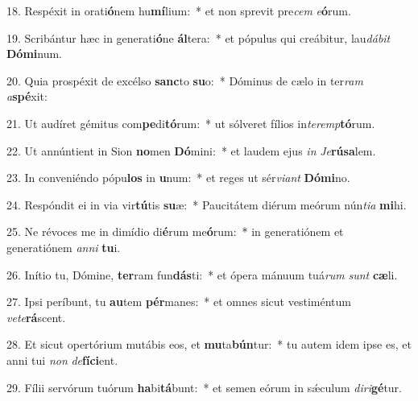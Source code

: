 18. Respéxit in orati\textbf{ó}nem hu\textbf{mí}lium:~*  et non sprevit pre\textit{cem} \textit{e}\textbf{ó}rum.\

19. Scribántur hæc in generati\textbf{ó}ne \textbf{ál}tera:~*  et pópulus qui creábitur, lau\textit{dá}\textit{bit} \textbf{Dó}\textbf{mi}num.\

20. Quia prospéxit de excélso \textbf{sanc}to \textbf{su}o:~*  Dóminus de cælo in ter\textit{ram} \textit{a}\textbf{spé}xit:\

21. Ut audíret gémitus com\textbf{pe}di\textbf{tó}rum:~*  ut sólveret fílios in\textit{ter}\textit{emp}\textbf{tó}rum.\

22. Ut annúntient in Sion \textbf{no}men \textbf{Dó}mini:~*  et laudem ejus \textit{in} \textit{Je}\textbf{rú}\textbf{sa}lem.\

23. In conveniéndo pópu\textbf{los} in \textbf{u}num:~*  et reges ut sér\textit{vi}\textit{ant} \textbf{Dó}\textbf{mi}no.\

24. Respóndit ei in via vir\textbf{tú}tis \textbf{su}æ:~*  Paucitátem diérum meórum nún\textit{ti}\textit{a} \textbf{mi}hi.\

25. Ne révoces me in dimídio di\textbf{é}rum me\textbf{ó}rum:~*  in generatiónem et generatiónem \textit{an}\textit{ni} \textbf{tu}i.\

26. Inítio tu, Dómine, \textbf{ter}ram fun\textbf{dás}ti:~*  et ópera mánuum tuá\textit{rum} \textit{sunt} \textbf{cæ}li.\

27. Ipsi períbunt, tu \textbf{au}tem \textbf{pér}manes:~*  et omnes sicut vestiméntum \textit{ve}\textit{te}\textbf{rá}scent.\

28. Et sicut opertórium mutábis eos, et \textbf{mu}ta\textbf{bún}tur:~*  tu autem idem ipse es, et anni tui \textit{non} \textit{de}\textbf{fí}\textbf{ci}ent.\

29. Fílii servórum tuórum \textbf{ha}bi\textbf{tá}bunt:~*  et semen eórum in sǽculum \textit{di}\textit{ri}\textbf{gé}tur.\

